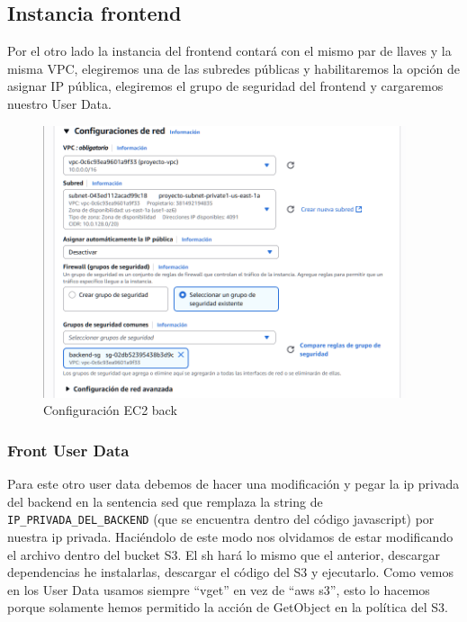 \documentclass{article}
\begin{document}
	\subsection{Instancia frontend}

	Por el otro lado la instancia del frontend contará con el mismo par de llaves y la misma VPC, elegiremos una de las subredes públicas y habilitaremos la opción de asignar IP pública, elegiremos el grupo de seguridad del frontend y cargaremos nuestro User Data. 

		
	\begin{figure}[H]
	\centering
	\includegraphics[width=0.95\textwidth]{configuracion_ec2_back.png}
	\caption{Configuración EC2 back}
	\end{figure}

	
	
	\newpage
	\subsubsection{Front User Data}

	Para este otro user data debemos de hacer una modificación y pegar la ip privada del backend en la sentencia sed que remplaza la string de \verb|IP_PRIVADA_DEL_BACKEND| (que se encuentra dentro del código javascript) por nuestra ip privada. Haciéndolo de este modo nos olvidamos de estar modificando el archivo dentro del bucket S3. El sh hará lo mismo que el anterior, descargar dependencias he instalarlas, descargar el código del S3 y ejecutarlo. Como vemos en los User Data usamos siempre ``vget'' en vez de ``aws s3'', esto lo hacemos porque solamente hemos permitido la acción de GetObject en la política del S3.
	
\end{document}
